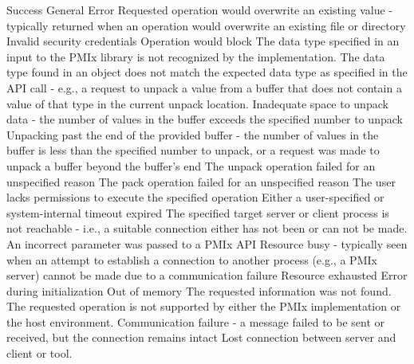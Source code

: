 \begin{constantdesc}
%
Success
%
General Error
%
Requested operation would overwrite an existing value - typically returned
when an operation would overwrite an existing file or directory
%
Invalid security credentials
%
Operation would block
%
The data type specified in an input to the \ac{PMIx} library is not recognized
by the implementation.
%
The data type found in an object does not match the expected data type
as specified in the \ac{API} call - e.g., a request to unpack a
 value from a buffer that does not contain a value of
that type in the current unpack location.
%
Inadequate space to unpack data - the number of values in the buffer exceeds
the specified number to unpack
%
Unpacking past the end of the provided buffer - the number of values in the
buffer is less than the specified number to unpack, or a request was made to
unpack a buffer beyond the buffer's end
%
The unpack operation failed for an unspecified reason
%
The pack operation failed for an unspecified reason
%
The user lacks permissions to execute the specified operation
%
Either a user-specified or system-internal timeout expired
%
The specified target server or client process is not reachable - i.e., a
suitable connection either has not been or can not be made.
%
An incorrect parameter was passed to a \ac{PMIx} \ac{API}
%
Resource busy - typically seen when an attempt to establish a connection
to another process (e.g., a \ac{PMIx} server) cannot be made due to a
communication failure
%
Resource exhausted
%
Error during initialization
%
Out of memory
%
The requested information was not found.
%
The requested operation is not supported by either the \ac{PMIx} implementation
or the host environment.
%
Communication failure - a message failed to be sent or received, but the
connection remains intact
%
Lost connection between server and client or tool.


\end{constantdesc}
